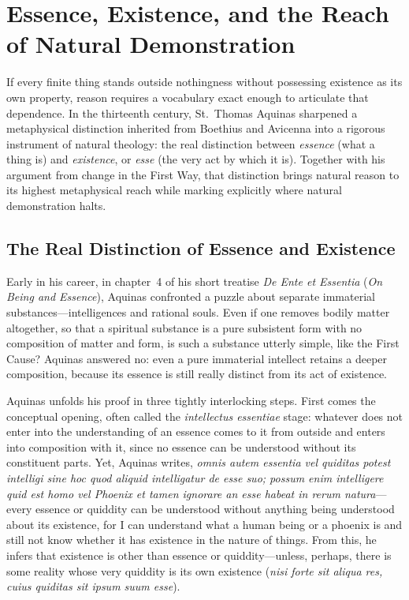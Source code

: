 \section{Essence, Existence, and the Reach of Natural Demonstration}

If every finite thing stands outside nothingness without possessing existence as its own property, reason requires a vocabulary exact enough to articulate that dependence. In the thirteenth century, St.\ Thomas Aquinas sharpened a metaphysical distinction inherited from Boethius and Avicenna into a rigorous instrument of natural theology: the real distinction between \emph{essence} (what a thing is) and \emph{existence}, or \emph{esse} (the very act by which it is). Together with his argument from change in the First Way, that distinction brings natural reason to its highest metaphysical reach while marking explicitly where natural demonstration halts.

\subsection{The Real Distinction of Essence and Existence}

Early in his career, in chapter~4 of his short treatise \emph{De Ente et Essentia} (\emph{On Being and Essence}), Aquinas confronted a puzzle about separate immaterial substances---intelligences and rational souls. Even if one removes bodily matter altogether, so that a spiritual substance is a pure subsistent form with no composition of matter and form, is such a substance utterly simple, like the First Cause? Aquinas answered no: even a pure immaterial intellect retains a deeper composition, because its essence is still really distinct from its act of existence.

Aquinas unfolds his proof in three tightly interlocking steps. First comes the conceptual opening, often called the \emph{intellectus essentiae} stage: whatever does not enter into the understanding of an essence comes to it from outside and enters into composition with it, since no essence can be understood without its constituent parts. Yet, Aquinas writes, \emph{omnis autem essentia vel quiditas potest intelligi sine hoc quod aliquid intelligatur de esse suo; possum enim intelligere quid est homo vel Phoenix et tamen ignorare an esse habeat in rerum natura}---every essence or quiddity can be understood without anything being understood about its existence, for I can understand what a human being or a phoenix is and still not know whether it has existence in the nature of things. From this, he infers that existence is other than essence or quiddity---unless, perhaps, there is some reality whose very quiddity is its own existence (\emph{nisi forte sit aliqua res, cuius quiditas sit ipsum suum esse}).

